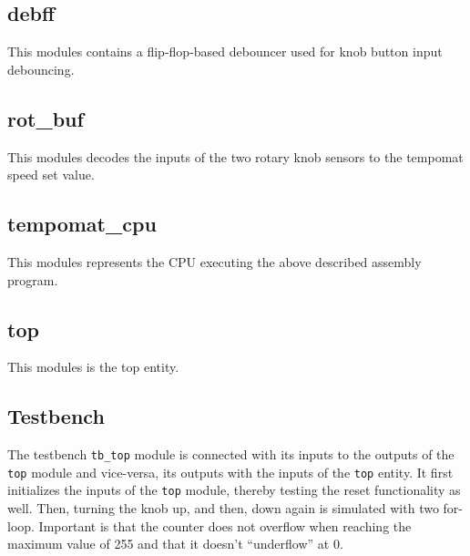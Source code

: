 \documentclass[a4paper,10pt]{scrartcl}
\begin{document}
\subsection{debff}
This modules contains a flip-flop-based debouncer used for knob button input debouncing. 





\subsection{rot\_buf}
This modules decodes the inputs of the two rotary knob sensors to the tempomat speed set value. 





\subsection{tempomat\_cpu}
This modules represents the CPU executing the above described assembly program. 





\subsection{top}
This modules is the top entity. 







\subsection{Testbench}
\label{sec:bench}


The testbench \texttt{tb\_top} module is connected with its inputs to the outputs of the \texttt{top} module and vice-versa, its outputs with the inputs of the \texttt{top} entity. 
It first initializes the inputs of the \texttt{top} module, thereby testing the reset functionality as well. 
Then, turning the knob up, and then, down again is simulated with two for-loop. 
Important is that the counter does not overflow when reaching the maximum value of 255 and that it doesn't ``underflow'' at 0.
\end{document}
